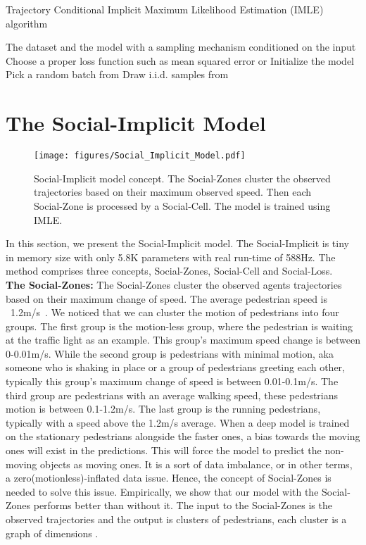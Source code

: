 \documentclass[runningheads]{llncs}
\begin{document}
\begin{algorithm}[h]
\caption{Trajectory Conditional Implicit Maximum Likelihood Estimation (IMLE) algorithm}
\label{alg:imle_proc}
\begin{algorithmic}
\Require The dataset  and the model  with a sampling mechanism conditioned on the input
\Require Choose a proper loss function  such as mean squared error or 
\State Initialize the model
    \State Pick a random batch  from 
    \State Draw i.i.d. samples  from \
    \State 
    \State 
\EndFor
\State \Return 
\end{algorithmic}
\end{algorithm}

\section{The Social-Implicit Model}
\begin{figure}[t]
\begin{center}
\texttt{[image: figures/Social\_Implicit\_Model.pdf]}
   \caption{Social-Implicit model concept. The Social-Zones cluster the observed trajectories based on their maximum observed speed. Then each Social-Zone is processed by a Social-Cell. The model is trained using IMLE. }
   \end{center}
\label{gr:social_implicit_model}
\end{figure}
In this section, we present the Social-Implicit model. The Social-Implicit is tiny in memory size with only 5.8K parameters with real run-time of 588Hz. The method comprises three concepts, Social-Zones, Social-Cell and Social-Loss.\\
\noindent\textbf{The Social-Zones: }The Social-Zones cluster the observed agents trajectories based on their maximum change of speed. The average pedestrian speed is ~1.2m/s~\cite{laplante2004continuing}. We noticed that we can cluster the motion of pedestrians into four groups. The first group is the motion-less group, where the pedestrian is waiting at the traffic light as an example. This group’s maximum speed change is between 0-0.01m/s. While the second group is pedestrians with minimal motion, aka someone who is shaking in place or a group of pedestrians greeting each other, typically this group's maximum change of speed is between 0.01-0.1m/s. The third group are pedestrians with an average walking speed, these pedestrians motion is between 0.1-1.2m/s. The last group is the running pedestrians, typically with a speed above the 1.2m/s average. When a deep model is trained on the stationary pedestrians alongside the faster ones, a bias towards the moving ones will exist in the predictions. This will force the model to predict the non-moving objects as moving ones. It is a sort of data imbalance, or in other terms, a zero(motionless)-inflated data issue. Hence, the concept of Social-Zones is needed to solve this issue. Empirically, we show that our model with the Social-Zones performs better than without it. The input to the Social-Zones is the observed trajectories and the output is clusters of pedestrians, each cluster is a graph of dimensions .\\
\end{document}
